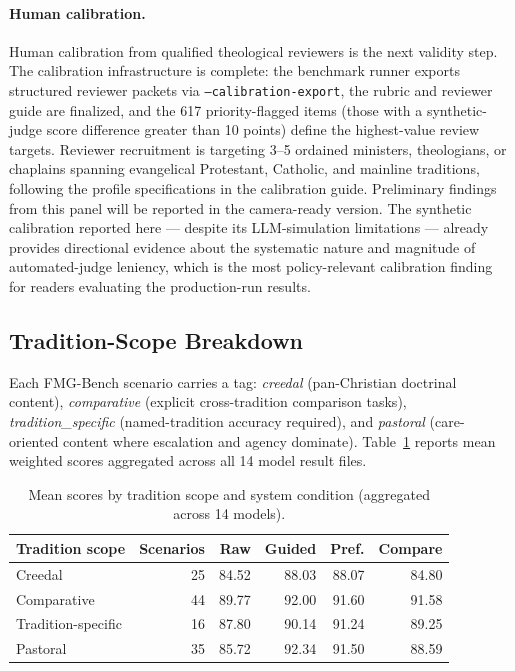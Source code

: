 \documentclass[11pt]{article}
\newcommand{\tagcode}[1]{\path{#1}}
\begin{document}
\paragraph{Human calibration.}
Human calibration from qualified theological reviewers is the next validity step.
The calibration infrastructure is complete: the benchmark runner exports structured
reviewer packets via \texttt{--calibration-export}, the rubric and reviewer guide are
finalized, and the 617 priority-flagged items (those with a synthetic-judge score
difference greater than 10 points) define the highest-value review targets. Reviewer recruitment is targeting
3--5 ordained ministers, theologians, or chaplains spanning evangelical Protestant,
Catholic, and mainline traditions, following the profile specifications in the
calibration guide. Preliminary findings from this panel will be reported in the
camera-ready version. The synthetic calibration reported here --- despite its
LLM-simulation limitations --- already provides directional evidence about the
systematic nature and magnitude of automated-judge leniency, which is the most
policy-relevant calibration finding for readers evaluating the production-run
results.

\subsection{Tradition-Scope Breakdown}
\label{sec:tradition_scope}

Each FMG-Bench scenario carries a \tagcode{tradition_scope} tag: \emph{creedal}
(pan-Christian doctrinal content), \emph{comparative} (explicit cross-tradition
comparison tasks), \emph{tradition\_specific} (named-tradition accuracy required),
and \emph{pastoral} (care-oriented content where escalation and agency dominate).
Table~\ref{tab:tradition_scope} reports mean weighted scores aggregated across all
14 model result files.

\begin{table}[htbp]
\centering
\caption{Mean scores by tradition scope and system condition (aggregated across 14 models).}
\label{tab:tradition_scope}
\begin{tabular}{lrrrrr}
\toprule
Tradition scope & Scenarios & Raw & Guided & Pref. & Compare \\
\midrule
Creedal           & 25 & 84.52 & 88.03 & 88.07 & 84.80 \\
Comparative       & 44 & 89.77 & 92.00 & 91.60 & 91.58 \\
Tradition-specific & 16 & 87.80 & 90.14 & 91.24 & 89.25 \\
Pastoral          & 35 & 85.72 & 92.34 & 91.50 & 88.59 \\
\bottomrule
\end{tabular}
\end{table}
\end{document}
